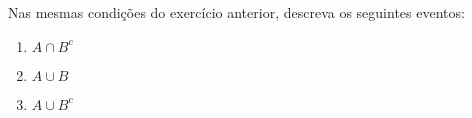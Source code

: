 \item 
Nas mesmas condições do exercício anterior, descreva os seguintes eventos:
\begin{enumerate}
\item $A \cap B^c$ 
\item $ A\cup B$ 
\item $ A \cup B^c$
\end{enumerate}

